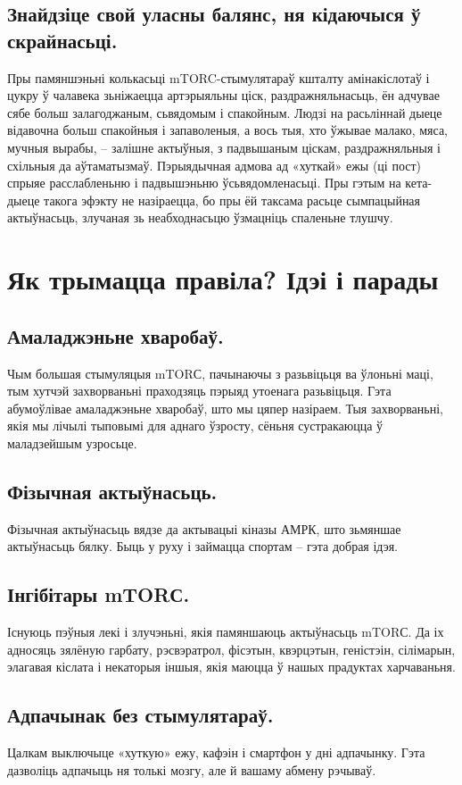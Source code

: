 \subsection{Знайдзіце свой уласны балянс, ня кідаючыся ў скрайнасьці.}
Пры памяншэньні колькасьці mTORC-стымулятараў кшталту амінакіслотаў і цукру ў чалавека зьніжаецца артэрыяльны ціск, раздражняльнасьць, ён адчувае сябе больш залагоджаным, сьвядомым і спакойным. Людзі на расьліннай дыеце відавочна больш спакойныя і запаволеныя, а вось тыя, хто ўжывае малако, мяса, мучныя вырабы, – залішне актыўныя, з падвышаным ціскам, раздражняльныя і схільныя да аўтаматызмаў. Пэрыядычная адмова ад «хуткай» ежы (ці пост) спрыяе расслабленьню і падвышэньню ўсьвядомленасьці. Пры гэтым на кета-дыеце такога эфэкту не назіраецца, бо пры ёй таксама расьце сымпацыйная актыўнасьць, злучаная зь неабходнасьцю ўзмацніць спаленьне тлушчу.

\section{Як трымацца правіла? Ідэі і парады}

\subsection{Амаладжэньне хваробаў.}
Чым большая стымуляцыя mTORС, пачынаючы з разьвіцьця ва ўлоньні маці, тым хутчэй захворваньні праходзяць пэрыяд утоенага разьвіцьця. Гэта абумоўлівае амаладжэньне хваробаў, што мы цяпер назіраем. Тыя захворваньні, якія мы лічылі тыповымі для аднаго ўзросту, сёньня сустракаюцца ў маладзейшым узросьце.

\subsection{Фізычная актыўнасьць.}
Фізычная актыўнасьць вядзе да актывацыі кіназы АМРК, што зьмяншае актыўнасьць бялку. Быць у руху і займацца спортам – гэта добрая ідэя.

\subsection{Інгібітары mTORС.}
Існуюць пэўныя лекі і злучэньні, якія памяншаюць актыўнасьць mTORС. Да іх адносяць зялёную гарбату, рэсвэратрол, фісэтын, квэрцэтын, геністэін, сілімарын, элагавая кіслата і некаторыя іншыя, якія маюцца ў нашых прадуктах харчаваньня.

\subsection{Адпачынак без стымулятараў.}
Цалкам выключыце «хуткую» ежу, кафэін і смартфон у дні адпачынку. Гэта дазволіць адпачыць ня толькі мозгу, але й вашаму абмену рэчываў.


